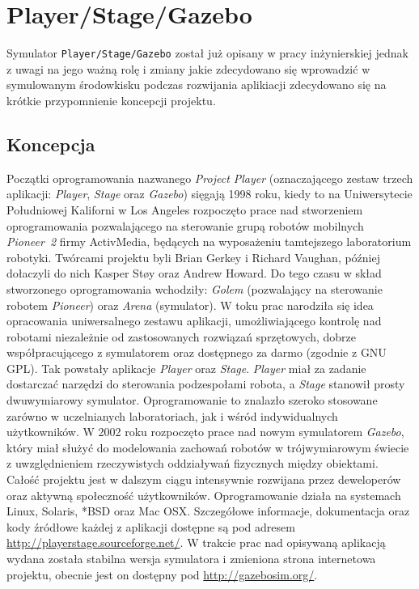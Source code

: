 \chapter[Player/Stage/Gazebo ]{Player/Stage/Gazebo \label{chap:gazebo}}
	Symulator \mbox{\texttt{Player/Stage/Gazebo}} został już opisany w pracy inżynierskiej \cite{inzynierka} jednak z uwagi na jego ważną rolę i zmiany jakie zdecydowano się wprowadzić w symulowanym
	środowkisku podczas rozwijania aplikiacji zdecydowano się na krótkie przypomnienie koncepcji projektu.

	\section{Koncepcja}
	Początki oprogramowania nazwanego \textit{Project Player} (oznaczającego zestaw trzech aplikacji: \textit{Player}, \textit{Stage} oraz \textit{Gazebo}) 
	sięgają 1998 roku, kiedy to
 	na Uniwersytecie Południowej Kaliforni w Los Angeles rozpoczęto prace nad stworzeniem oprogramowania pozwalającego 
 	na sterowanie grupą robotów mobilnych \textit{Pioneer~2} firmy ActivMedia, będących na wyposażeniu tamtejszego laboratorium robotyki. 
	Twórcami projektu byli Brian Gerkey i Richard Vaughan, później dołaczyli do nich Kasper St{\o}y oraz Andrew Howard.
	Do tego czasu w skład stworzonego oprogramowania wchodziły: \textit{Golem} (pozwalający na sterowanie
	robotem \textit{Pioneer}) oraz \textit{Arena} (symulator). W toku prac narodziła się idea opracowania uniwersalnego zestawu aplikacji, umożliwiającego kontrolę nad robotami niezależnie od zastosowanych rozwiązań sprzętowych, 
	dobrze współpracującego z symulatorem oraz dostępnego za darmo (zgodnie z GNU GPL). 
	Tak powstały aplikacje \textit{Player} oraz \textit{Stage}. \textit{Player} miał za zadanie dostarczać narzędzi do sterowania podzespołami robota, 
	a \textit{Stage} stanowił prosty dwuwymiarowy symulator. Oprogramowanie to znalazło szeroko stosowane 
	zarówno w uczelnianych laboratoriach, jak i wśród indywidualnych użytkowników. W 2002 roku rozpoczęto prace
	nad nowym symulatorem \textit{Gazebo}, który miał służyć do modelowania zachowań robotów w trójwymiarowym świecie 
	z uwzględnieniem rzeczywistych oddziaływań fizycznych między obiektami. Całość projektu jest w dalszym ciągu intensywnie rozwijana przez
	deweloperów oraz aktywną społeczność użytkowników. Oprogramowanie działa na systemach Linux, Solaris, *BSD oraz Mac OSX. 
	Szczegółowe informacje, dokumentacja oraz kody źródłowe każdej z aplikacji dostępne są pod adresem \url{http://playerstage.sourceforge.net/}.
	W trakcie prac nad opisywaną aplikacją wydana została stabilna wersja symulatora i zmieniona strona internetowa projektu, obecnie jest on dostępny pod \url{http://gazebosim.org/}.
	
